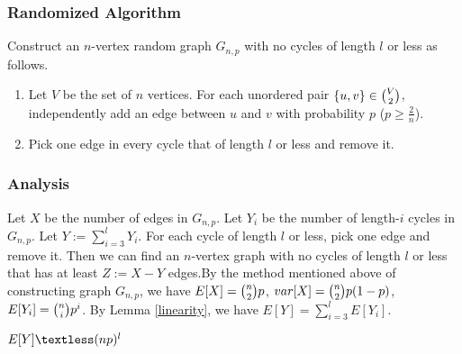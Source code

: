 \subsubsection{Randomized Algorithm}
Construct an $n$-vertex random graph $G_{n,p}$ with no cycles of length $l$ or less as follows. 
\begin{enumerate}
    \item Let $V$ be the set of $n$ vertices. For each unordered pair $\{u,v\}\in \tbinom{V}{2}$, independently add an edge between $u$ and $v$ with probability $p$ ($p\ge \frac{2}{n}$).
    \item Pick one edge in every cycle that of length $l$ or less and remove it.
\end{enumerate}

\subsubsection{Analysis} 
Let $X$ be the number of edges in $G_{n,p}$. Let $Y_i$ be the number of length-$i$ cycles in $G_{n,p}$. Let $Y:=\sum_{i=3}^{l}Y_i$.
For each cycle of length $l$ or less, pick one edge and remove it.
Then we can find an $n$-vertex graph with no cycles of length $l$ or less that has at least $Z:=X-Y$ edges.By the method mentioned above of constructing graph $G_{n,p}$, we have $E[X]=\tbinom{n}{2}p$, $var[X]=\tbinom{n}{2}p(1-p)$, $E[Y_i]=\tbinom{n}{i}p^i$. By Lemma \ref{linearity}, we have $E[Y]=\sum_{i=3}^{l}E[Y_i]$.
\begin{claim}
$E[Y]\textless (np)^l$
\end{claim}
